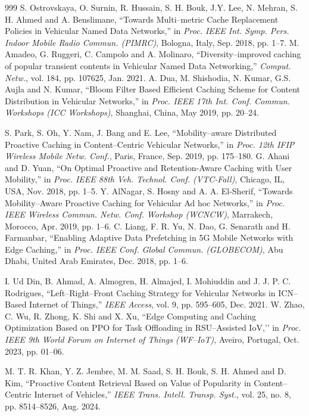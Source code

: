 \documentclass[journal]{IEEEtran}
\begin{document}
\begin{thebibliography}{999}
 S. Ostrovskaya, O. Surnin, R. Hussain, S. H. Bouk, J.Y. Lee, N. Mehran, S. H. Ahmed and A. Benslimane, ``Towards Multi--metric Cache Replacement Policies in Vehicular Named Data Networks,'' in \emph{Proc. IEEE Int. Symp. Pers. Indoor Mobile Radio Commun. (PIMRC)}, Bologna, Italy, Sep. 2018, pp. 1--7.
 M. Amadeo, G. Ruggeri, C. Campolo and A. Molinaro, ``Diversity--improved caching of popular transient contents in Vehicular Named Data Networking,'' \emph{Comput. Netw.}, vol. 184, pp. 107625, Jan. 2021.
 A. Dua, M. Shishodia, N. Kumar, G.S. Aujla and N. Kumar, ``Bloom Filter Based Efficient Caching Scheme for Content Distribution in Vehicular Networks,'' in \emph{Proc. IEEE 17th Int. Conf. Commun. Workshops (ICC Workshops)}, Shanghai, China, May 2019, pp. 20--24.

 S. Park, S. Oh, Y. Nam, J. Bang and E. Lee,  ``Mobility--aware Distributed Proactive Caching in Content--Centric Vehicular Networks,'' in \emph{Proc. 12th IFIP Wireless Mobile Netw. Conf.}, Paris, France, Sep. 2019, pp. 175--180.
 G. Ahani and D. Yuan, ``On Optimal Proactive and Retention-Aware Caching with User Mobility,'' in \emph{Proc. IEEE 88th Veh. Technol. Conf. (VTC-Fall)}, Chicago, IL, USA, Nov. 2018, pp. 1--5.
 Y. AlNagar, S. Hosny and A. A. El-Sherif, ``Towards Mobility--Aware Proactive Caching for Vehicular Ad hoc Networks,'' in \emph{Proc. IEEE Wireless Commun. Netw. Conf. Workshop (WCNCW)}, Marrakech, Morocco, Apr. 2019, pp. 1--6.
 C. Liang, F. R. Yu, N. Dao, G. Senarath and H. Farmanbar, ``Enabling Adaptive Data Prefetching in 5G Mobile Networks with Edge Caching,'' in \emph{Proc. IEEE Conf. Global Commun. (GLOBECOM)}, Abu Dhabi, United Arab Emirates, Dec. 2018, pp. 1--6.

 I. Ud Din, B. Ahmad, A. Almogren, H. Almajed, I. Mohiuddin and J. J. P. C. Rodrigues,  ``Left--Right--Front Caching Strategy for Vehicular Networks in ICN--Based Internet of Things,'' \textit{IEEE Access}, vol. 9, pp. 595--605, Dec. 2021.
 W. Zhao, C. Wu, R. Zhong, K. Shi and X. Xu, ``Edge Computing and Caching Optimization Based on PPO for Task Offloading in RSU--Assisted IoV,’’ in \emph{Proc. IEEE 9th World Forum on Internet of Things (WF--IoT)}, Aveiro, Portugal, Oct. 2023, pp. 01--06.

 M. T. R. Khan, Y. Z. Jembre, M. M. Saad, S. H. Bouk, S. H. Ahmed and D. Kim, ``Proactive Content Retrieval Based on Value of Popularity in Content--Centric Internet of Vehicles,'' \emph{IEEE Trans. Intell. Transp. Syst.}, vol. 25, no. 8, pp. 8514--8526, Aug. 2024.


\end{thebibliography}
\end{document}
